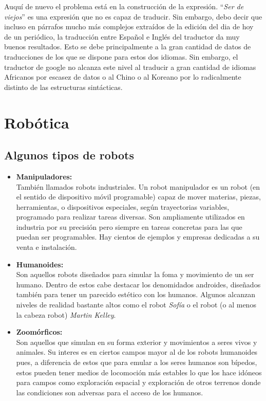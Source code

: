 \documentclass[final]{CSP}
\begin{document}
Auquí de nuevo el problema está en la construcción de la expresión. ``\textit{Ser de viejos}'' 
es una expresión que no es capaz de traducir. Sin embargo, debo decir que incluso en párrafos
mucho más complejos extraídos de la edición del dia de hoy de un periódico, la traducción entre
Español e Inglés del traductor da muy buenos resultados. Esto se debe principalmente a la gran 
cantidad de datos de traducciones de los que se dispone para estos dos idiomas. Sin embargo, el
traductor de google no alcanza este nivel al traducir a gran cantidad de idiomas Africanos por 
escasez de datos o al Chino o al Koreano por lo radicalmente distinto de las estructuras 
sintácticas.

\section{Robótica}

\subsection{Algunos tipos de robots}

\begin{itemize}
\item \textbf{Manipuladores:}\\
También llamados robots industriales. Un robot manipulador es un robot (en el sentido de  
dispositivo móvil programable) capaz de mover materias, piezas, herramientas, o dispositivos 
especiales, según trayectorias variables, programado para realizar tareas diversas. Son
ampliamente utilizados en industria por su precisión pero siempre en tareas concretas para
las que puedan ser programables. Hay cientos de ejemplos y empresas dedicadas a su venta e 
instalación.

\item \textbf{Humanoides:}\\
Son aquellos robots diseñados para simular la foma y movimiento de un ser humano. Dentro de estos
cabe destacar los denomidados androides, diseñados también para tener un parecido estético con los
humanos. Algunos alcanzan niveles de realidad bastante altos como el robot \textit{Sofía} o el 
robot (o al menos la cabeza robot) \textit{Martin Kelley}.

\item \textbf{Zoomórficos:}\\
Son aquellos que simulan en su forma exterior y movimientos a seres vivos y animales. Su interes
es en ciertos campos mayor al de los robots humanoides pues, a diferencia de estos que para 
emular a los seres humanos son bípedos, estos pueden tener medios de locomoción más estables lo
que los hace idóneos para campos como exploración espacial y exploración de otros terrenos donde
las condiciones son adversas para el acceso de los humanos.
\end{itemize}
\end{document}
